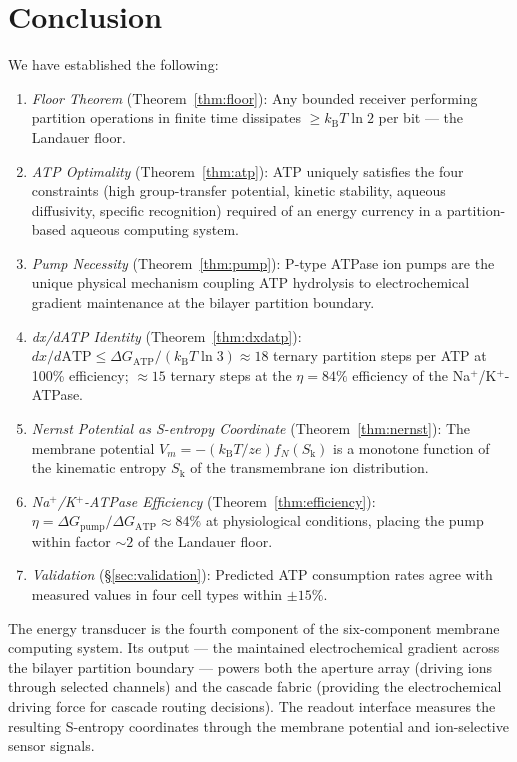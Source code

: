 \documentclass[11pt,twocolumn,a4paper]{article}
\theoremstyle{definition}
\theoremstyle{remark}
\newcommand{\kB}{k_{\mathrm{B}}}
\newcommand{\Sk}{S_{\mathrm{k}}}
\begin{document}
\section{Conclusion}
\label{sec:conclusion}

We have established the following:

\begin{enumerate}[nosep]
\item \textit{Floor Theorem} (Theorem~\ref{thm:floor}):
  Any bounded receiver performing partition operations in finite time
  dissipates $\geq \kB T \ln 2$ per bit --- the Landauer floor.
\item \textit{ATP Optimality} (Theorem~\ref{thm:atp}):
  ATP uniquely satisfies the four constraints (high group-transfer potential,
  kinetic stability, aqueous diffusivity, specific recognition) required of
  an energy currency in a partition-based aqueous computing system.
\item \textit{Pump Necessity} (Theorem~\ref{thm:pump}):
  P-type ATPase ion pumps are the unique physical mechanism coupling ATP
  hydrolysis to electrochemical gradient maintenance at the bilayer partition
  boundary.
\item \textit{dx/dATP Identity} (Theorem~\ref{thm:dxdatp}):
  $dx/d\mathrm{ATP} \leq \Delta G_{\mathrm{ATP}} / (\kB T \ln 3)
  \approx 18$ ternary partition steps per ATP at 100\% efficiency;
  $\approx 15$ ternary steps at the $\eta = 84\%$ efficiency of the
  Na$^+$/K$^+$-ATPase.
\item \textit{Nernst Potential as S-entropy Coordinate} (Theorem~\ref{thm:nernst}):
  The membrane potential $V_m = -(\kB T/ze) f_N(\Sk)$ is a monotone function
  of the kinematic entropy $\Sk$ of the transmembrane ion distribution.
\item \textit{Na$^+$/K$^+$-ATPase Efficiency} (Theorem~\ref{thm:efficiency}):
  $\eta = \Delta G_{\mathrm{pump}} / \Delta G_{\mathrm{ATP}} \approx 84\%$
  at physiological conditions, placing the pump within factor $\sim 2$ of
  the Landauer floor.
\item \textit{Validation} (\S\ref{sec:validation}): Predicted ATP consumption
  rates agree with measured values in four cell types within $\pm 15\%$.
\end{enumerate}

The energy transducer is the fourth component of the six-component membrane
computing system. Its output --- the maintained electrochemical gradient across
the bilayer partition boundary --- powers both the aperture array \citep{companion3}
(driving ions through selected channels) and the cascade fabric \citep{companion5}
(providing the electrochemical driving force for cascade routing decisions).
The readout interface \citep{companion6} measures the resulting S-entropy
coordinates through the membrane potential and ion-selective sensor signals.



\end{document}
